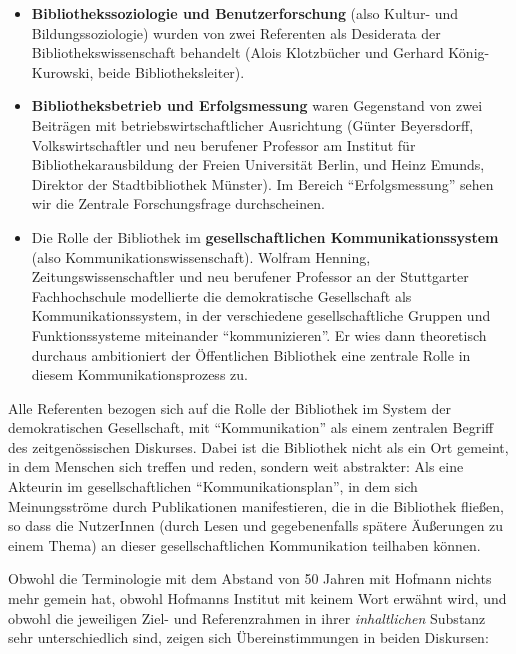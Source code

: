 \documentclass[a4paper,
fontsize=11pt,
oneside,
numbers=noperiodatend,
parskip=half-,
bibliography=totoc,
final
]{scrartcl}
\begin{document}
\begin{itemize}
\item
  \textbf{Bibliothekssoziologie und Benutzerforschung} (also Kultur- und
  Bildungssoziologie) \linebreak wurden von zwei Referenten als Desiderata der
  Bibliothekswissenschaft behandelt (Alois Klotzbücher und Gerhard
  König-Kurowski, beide Bibliotheksleiter).
\item
  \textbf{Bibliotheksbetrieb und Erfolgsmessung} waren Gegenstand von
  zwei Beiträgen mit betriebswirtschaftlicher Ausrichtung (Günter
  Beyersdorff, Volkswirtschaftler und neu berufener Professor am
  Institut für Bibliothekarausbildung der Freien Universität Berlin, und
  Heinz Emunds, Direktor der Stadtbibliothek Münster). Im Bereich
  \enquote{Erfolgsmessung} sehen wir die Zentrale Forschungsfrage
  durchscheinen.
\item
  Die Rolle der Bibliothek im \textbf{gesellschaftlichen
  Kommunikationssystem} (also Kommunikationswissenschaft). Wolfram
  Henning, Zeitungswissenschaftler und neu berufener Professor an der
  Stuttgarter Fachhochschule modellierte die demokratische Gesellschaft
  als Kommunikationssystem, in der verschiedene gesellschaftliche
  Gruppen und Funktionssysteme miteinander \enquote{kommunizieren}. Er
  wies dann theoretisch durchaus ambitioniert der Öffentlichen
  Bibliothek eine zentrale Rolle in diesem Kommunikationsprozess zu.
\end{itemize}

Alle Referenten bezogen sich auf die Rolle der Bibliothek im System der
demokratischen Gesellschaft, mit \enquote{Kommunikation} als einem
zentralen Begriff des zeitgenössischen Diskurses. Dabei ist die
Bibliothek nicht als ein Ort gemeint, in dem Menschen sich treffen und
reden, sondern weit abstrakter: Als eine Akteurin im gesellschaftlichen
\enquote{Kommunikationsplan}, in dem sich Meinungsströme durch
Publikationen manifestieren, die in die Bibliothek fließen, so dass die
NutzerInnen (durch Lesen und gegebenenfalls spätere Äußerungen zu einem
Thema) an dieser gesellschaftlichen Kommunikation teilhaben können.

Obwohl die Terminologie mit dem Abstand von 50 Jahren mit Hofmann nichts
mehr gemein hat, obwohl Hofmanns Institut mit keinem Wort erwähnt wird,
und obwohl die jeweiligen Ziel- und Referenzrahmen in ihrer
\emph{inhaltlichen} Substanz sehr unterschiedlich sind, zeigen sich
Übereinstimmungen in beiden Diskursen:
\end{document}
